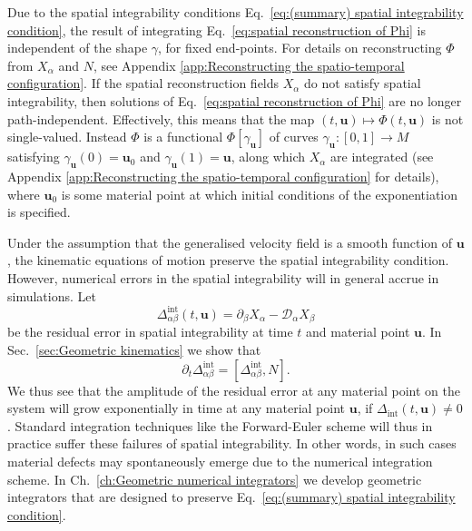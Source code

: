 Due to the spatial integrability conditions Eq.~\ref{eq:(summary) spatial integrability condition}, the result of integrating Eq.~\ref{eq:spatial reconstruction of Phi} is independent of the shape $\gamma$, for fixed end-points. For details on reconstructing $\Phi$ from $X_\alpha$ and $N$, see Appendix \ref{app:Reconstructing the spatio-temporal configuration}. If the spatial reconstruction fields $X_\alpha$ do not satisfy spatial integrability, then solutions of Eq.~\ref{eq:spatial reconstruction of Phi} are no longer path-independent. Effectively, this means that the map $(t, \mathbf{u}) \mapsto \Phi(t, \mathbf{u})$ is not single-valued. Instead $\Phi$ is a functional $\Phi[\gamma_\mathbf{u}]$ of curves $\gamma_\mathbf{u} : [0,1] \to M$ satisfying $\gamma_\mathbf{u}(0) = \mathbf{u}_0$ and $\gamma_\mathbf{u}(1) = \mathbf{u}$, along which $X_\alpha$ are integrated (see Appendix \ref{app:Reconstructing the spatio-temporal configuration} for details), where $\mathbf{u}_0$ is some material point at which initial conditions of the exponentiation is specified.

Under the assumption that the generalised velocity field is a smooth function of $\mathbf{u}$, the kinematic equations of motion preserve the spatial integrability condition. However, numerical errors in the spatial integrability will in general accrue in simulations. Let
\begin{equation} \label{eq:spatial integrability residual}
	\Delta^\text{int}_{\alpha \beta}(t, \mathbf{u}) = \partial_\beta X_\alpha - \mathcal{D}_\alpha X_\beta
\end{equation}
be the residual error in spatial integrability at time $t$ and material point $\mathbf{u}$. In Sec.~\ref{sec:Geometric kinematics} we show that 
\begin{equation} \label{eq:(summary) time derivative of spatial integrability conditions}
\partial_t \Delta^\text{int}_{\alpha \beta} = [ \Delta^\text{int}_{\alpha \beta}, N].
\end{equation}
We thus see that the amplitude of the residual error at any material point on the system will grow exponentially in time at any material point $\mathbf{u}$, if $\Delta_\text{int}(t,\mathbf{u}) \neq 0$. Standard integration techniques like the Forward-Euler scheme will thus in practice suffer these failures of spatial integrability. In other words, in such cases material defects may spontaneously emerge due to the numerical integration scheme. In Ch.~\ref{ch:Geometric numerical integrators} we develop geometric integrators that are designed to preserve Eq.~\ref{eq:(summary) spatial integrability condition}. 

